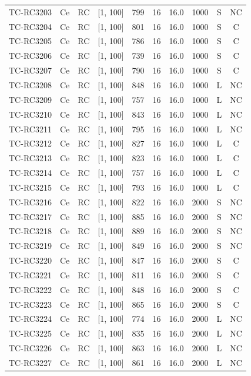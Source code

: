 \begin{longtable}{lccccccccc}
TC-RC3203 & Ce & RC & [1, 100] & 799 & 16 & 16.0 & 1000 & S & NC \\
TC-RC3204 & Ce & RC & [1, 100] & 801 & 16 & 16.0 & 1000 & S & C \\
TC-RC3205 & Ce & RC & [1, 100] & 786 & 16 & 16.0 & 1000 & S & C \\
TC-RC3206 & Ce & RC & [1, 100] & 739 & 16 & 16.0 & 1000 & S & C \\
TC-RC3207 & Ce & RC & [1, 100] & 790 & 16 & 16.0 & 1000 & S & C \\
TC-RC3208 & Ce & RC & [1, 100] & 848 & 16 & 16.0 & 1000 & L & NC \\
TC-RC3209 & Ce & RC & [1, 100] & 757 & 16 & 16.0 & 1000 & L & NC \\
TC-RC3210 & Ce & RC & [1, 100] & 843 & 16 & 16.0 & 1000 & L & NC \\
TC-RC3211 & Ce & RC & [1, 100] & 795 & 16 & 16.0 & 1000 & L & NC \\
TC-RC3212 & Ce & RC & [1, 100] & 827 & 16 & 16.0 & 1000 & L & C \\
TC-RC3213 & Ce & RC & [1, 100] & 823 & 16 & 16.0 & 1000 & L & C \\
TC-RC3214 & Ce & RC & [1, 100] & 757 & 16 & 16.0 & 1000 & L & C \\
TC-RC3215 & Ce & RC & [1, 100] & 793 & 16 & 16.0 & 1000 & L & C \\
TC-RC3216 & Ce & RC & [1, 100] & 822 & 16 & 16.0 & 2000 & S & NC \\
TC-RC3217 & Ce & RC & [1, 100] & 885 & 16 & 16.0 & 2000 & S & NC \\
TC-RC3218 & Ce & RC & [1, 100] & 889 & 16 & 16.0 & 2000 & S & NC \\
TC-RC3219 & Ce & RC & [1, 100] & 849 & 16 & 16.0 & 2000 & S & NC \\
TC-RC3220 & Ce & RC & [1, 100] & 847 & 16 & 16.0 & 2000 & S & C \\
TC-RC3221 & Ce & RC & [1, 100] & 811 & 16 & 16.0 & 2000 & S & C \\
TC-RC3222 & Ce & RC & [1, 100] & 848 & 16 & 16.0 & 2000 & S & C \\
TC-RC3223 & Ce & RC & [1, 100] & 865 & 16 & 16.0 & 2000 & S & C \\
TC-RC3224 & Ce & RC & [1, 100] & 774 & 16 & 16.0 & 2000 & L & NC \\
TC-RC3225 & Ce & RC & [1, 100] & 835 & 16 & 16.0 & 2000 & L & NC \\
TC-RC3226 & Ce & RC & [1, 100] & 863 & 16 & 16.0 & 2000 & L & NC \\
TC-RC3227 & Ce & RC & [1, 100] & 861 & 16 & 16.0 & 2000 & L & NC \\

\end{longtable}
